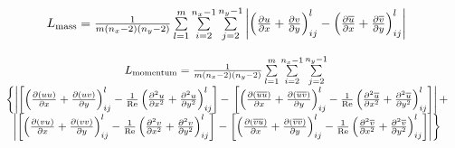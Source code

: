 \begin{align}
	\begin{array}{*{20}{c}}
		{{L_{{\rm{mass}}}} = \frac{1}{{m\left( {{n_x} - 2} \right)\left( {{n_y} - 2} \right)}}\sum\limits_{l = 1}^m {\sum\limits_{i = 2}^{{n_x} - 1} {\sum\limits_{j = 2}^{{n_y} - 1} {} } } } 
		{\left| {\left( {\frac{{\partial u}}{{\partial x}} + \frac{{\partial v}}{{\partial y}}} \right)_{ij}^l - \left( {\frac{{\partial \overline u }}{{\partial x}} + \frac{{\partial \overline v }}{{\partial y}}} \right)_{ij}^l} \right|}  
	\end{array}
\end{align}

\begin{align}
	\begin{array}{*{20}{c}}
		{{L_{{\rm{momentum}}}} = \frac{1}{{m\left( {{n_x} - 2} \right)\left( {{n_y} - 2} \right)}}\sum\limits_{l = 1}^m {\sum\limits_{i = 2}^{{n_x} - 1} {\sum\limits_{j = 2}^{{n_y} - 1} {} } } }  \\
		{\left\{ {\left| {\left[ {\left( {\frac{{\partial (uu)}}{{\partial x}} + \frac{{\partial \left( {uv} \right)}}{{\partial y}}} \right)_{ij}^l - \frac{1}{{{\mathop{\rm Re}\nolimits} }}\left( {\frac{{{\partial ^2}u}}{{\partial {x^2}}} + \frac{{{\partial ^2}u}}{{\partial {y^2}}}} \right)_{ij}^l} \right] - } \right.} \right.}  
		{\left. {\left[ {\left( {\frac{{\partial (\overline u \overline u )}}{{\partial x}} + \frac{{\partial \left( {\overline u \overline v } \right)}}{{\partial y}}} \right)_{ij}^l - \frac{1}{{{\mathop{\rm Re}\nolimits} }}\left( {\frac{{{\partial ^2}\overline u }}{{\partial {x^2}}} + \frac{{{\partial ^2}\overline u }}{{\partial {y^2}}}} \right)_{ij}^l} \right]} \right| + }  \\
		{\left| {\left[ {\left( {\frac{{\partial (vu)}}{{\partial x}} + \frac{{\partial \left( {vv} \right)}}{{\partial y}}} \right)_{ij}^l - \frac{1}{{{\mathop{\rm Re}\nolimits} }}\left( {\frac{{{\partial ^2}v}}{{\partial {x^2}}} + \frac{{{\partial ^2}v}}{{\partial {y^2}}}} \right)_{ij}^l} \right]} \right. - }  
		{\left. {\left. {\left[ {\left( {\frac{{\partial (\overline v \overline u )}}{{\partial x}} + \frac{{\partial \left( {\overline v \overline v } \right)}}{{\partial y}}} \right)_{ij}^l - \frac{1}{{{\mathop{\rm Re}\nolimits} }}\left( {\frac{{{\partial ^2}\overline v }}{{\partial {x^2}}} + \frac{{{\partial ^2}\overline v }}{{\partial {y^2}}}} \right)_{ij}^l} \right]} \right|} \right\}}  
	\end{array}
\end{align}


